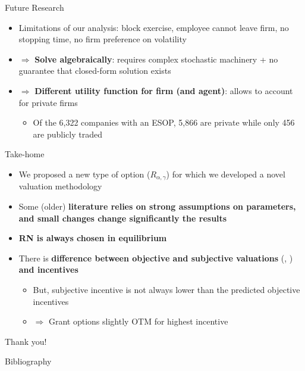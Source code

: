 \documentclass[compress]{beamer}
\begin{document}
\begin{frame}{Future Research}
    \begin{itemize}
        \item Limitations of our analysis: block exercise, employee cannot leave firm, no stopping time, no firm preference on volatility
        \item $\Rightarrow$ \textbf{Solve algebraically}: requires complex stochastic machinery + no guarantee that closed-form solution exists
        \item $\Rightarrow$ \textbf{Different utility function for firm (and agent)}: allows to account for private firms
        \begin{itemize}
            \item Of the 6,322 companies with an ESOP, 5,866 are private while only 456 are publicly traded \citep{nceoNCEOHome}
        \end{itemize}
    \end{itemize}
\end{frame}

\begin{frame}{Take-home}
    \begin{itemize}
        \item We proposed a new type of option ($R_{\alpha, \gamma}$) for which we developed a novel valuation methodology
        \item Some (older) \textbf{literature relies on strong assumptions on parameters, and small changes change significantly the results}
        \item  \textbf{RN is always chosen in equilibrium}
        \item There is \textbf{difference between objective and subjective valuations} (\citet{meulbroek2001efficiency}, \citet{ingersoll2006valuing}) \textbf{and incentives}
        \begin{itemize}
            \item But, subjective incentive is not always lower than the predicted objective incentives
            \item $\Rightarrow$ Grant options slightly OTM for highest incentive
        \end{itemize}        
    \end{itemize}
\end{frame}


\begin{frame}{}
    \begin{center}
        \Huge Thank you!
    \end{center}
\end{frame}



\appendix
\begin{frame}[allowframebreaks]{Bibliography}
    \printbibliography
\end{frame}



\end{document}
